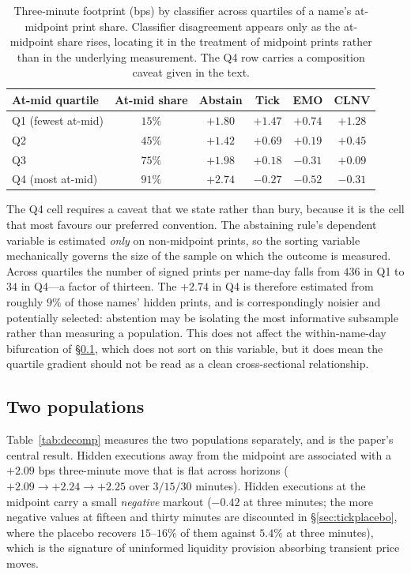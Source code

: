 \documentclass[11pt]{article}
\begin{document}
\begin{table}[htbp]
\centering
\begin{tabular}{lccccc}
\toprule
\textbf{At-mid quartile} & \textbf{At-mid share} & \textbf{Abstain} & \textbf{Tick} & \textbf{EMO} & \textbf{CLNV} \\
\midrule
Q1 (fewest at-mid) & $15\%$ & $+1.80$ & $+1.47$ & $+0.74$ & $+1.28$ \\
Q2 & $45\%$ & $+1.42$ & $+0.69$ & $+0.19$ & $+0.45$ \\
Q3 & $75\%$ & $+1.98$ & $+0.18$ & $-0.31$ & $+0.09$ \\
Q4 (most at-mid) & $91\%$ & $+2.74$ & $-0.27$ & $-0.52$ & $-0.31$ \\
\bottomrule
\end{tabular}
\caption{Three-minute footprint (bps) by classifier across quartiles of a name's
at-midpoint print share. Classifier disagreement appears only as the at-midpoint share
rises, locating it in the treatment of midpoint prints rather than in the underlying
measurement. The Q4 row carries a composition caveat given in the text.}
\label{tab:signing_quartile}
\end{table}

The Q4 cell requires a caveat that we state rather than bury, because it is the cell that
most favours our preferred convention. The abstaining rule's dependent variable is estimated
\emph{only} on non-midpoint prints, so the sorting variable mechanically governs the size of
the sample on which the outcome is measured. Across quartiles the number of signed prints
per name-day falls from $436$ in Q1 to $34$ in Q4---a factor of thirteen. The $+2.74$ in Q4
is therefore estimated from roughly $9\%$ of those names' hidden prints, and is
correspondingly noisier and potentially selected: abstention may be isolating the most
informative subsample rather than measuring a population. This does not affect the
within-name-day bifurcation of \S\ref{sec:decomp}, which does not sort on this variable, but
it does mean the quartile gradient should not be read as a clean cross-sectional
relationship.

\subsection{Two populations}
\label{sec:decomp}

Table~\ref{tab:decomp} measures the two populations separately, and is the paper's central
result. Hidden executions away from the midpoint are associated with a $+2.09$ bps
three-minute move that is flat across horizons ($+2.09 \to +2.24 \to +2.25$ over
$3/15/30$ minutes). Hidden executions at the midpoint carry a small \emph{negative} markout
($-0.42$ at three minutes; the more negative values at fifteen and thirty minutes are
discounted in \S\ref{sec:tickplacebo}, where the placebo recovers $15$--$16\%$ of them
against $5.4\%$ at three minutes), which is the signature of
uninformed liquidity provision absorbing transient price moves.
\end{document}
